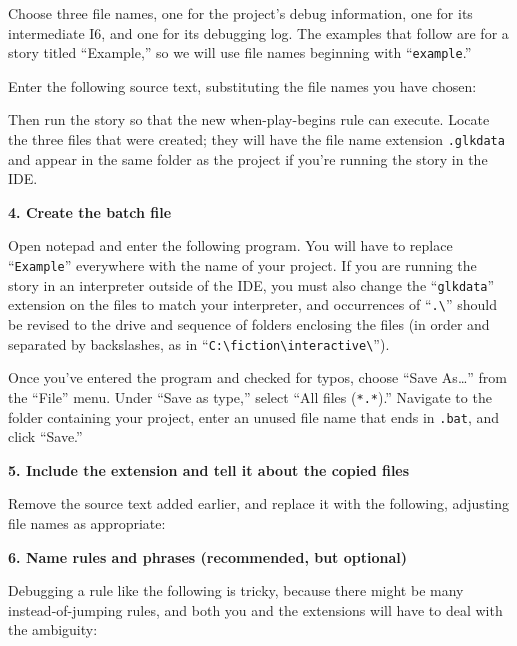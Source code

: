 \documentclass{book}
\begin{document}
Choose three file names, one for the project's debug information, one for its
intermediate I6, and one for its debugging log.  The examples that follow are
for a story titled ``Example,'' so we will use file names beginning with
``\texttt{example}.''

Enter the following source text, substituting the file names you have chosen:

\begin{quote}
  
\end{quote}

Then run the story so that the new when-play-begins rule can execute.  Locate
the three files that were created; they will have the file name extension
\texttt{.glkdata} and appear in the same folder as the project if you're
running the story in the IDE.

\textbf{4. Create the batch file}

Open notepad and enter the following program.  You will have to replace
``\texttt{Example}'' everywhere with the name of your project.  If you are
running the story in an interpreter outside of the IDE, you must also change the
``\texttt{glkdata}'' extension on the files to match your interpreter, and
occurrences of ``\lstinline{.\}'' should be revised to the drive and sequence of
  folders enclosing the files (in order and separated by backslashes, as in
  ``\lstinline{C:\fiction\interactive\}'').

\begin{quote}
  
\end{quote}

Once you've entered the program and checked for typos, choose ``Save As\dots''
from the ``File'' menu.  Under ``Save as type,'' select ``All files
(\texttt{*.*}).''  Navigate to the folder containing your project, enter an
unused file name that ends in \texttt{.bat}, and click ``Save.''

\textbf{5. Include the extension and tell it about the copied files}

Remove the source text added earlier, and replace it with the following,
adjusting file names as appropriate:

\begin{quote}
  
\end{quote}

\textbf{6. Name rules and phrases (recommended, but optional)}

Debugging a rule like the following is tricky, because there might be many
instead-of-jumping rules, and both you and the extensions will have to deal with
the ambiguity:
\end{document}
